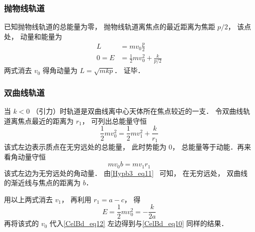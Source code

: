 \subsubsection{抛物线轨道}
已知抛物线轨道的总能量为零， 抛物线轨道离焦点的最近距离为焦距 $p/2$， 该点处， 动量和能量为
\begin{align}
L &= mv_0 \frac p2\\
0 = E &= \frac 12 mv_0^2 + \frac{k}{p/2}
\end{align}
两式消去 $v_0$ 得角动量为 $L = \sqrt{mkp}$． 证毕．

\subsubsection{双曲线轨道}
当 $k<0$ （引力）时轨道是双曲线离中心天体所在焦点较近的一支． 令双曲线轨道离焦点最近的距离为 $r_1$， 可列出总能量守恒
\begin{equation}\label{CelBd_eq11}
\frac12 mv_0^2 = \frac12 mv_1^2 + \frac{k}{r_1}
\end{equation}
该式左边表示质点在无穷远处的总能量， 此时势能为 $0$， 总能量等于动能．再来看角动量守恒
\begin{equation}\label{CelBd_eq12}
m v_0 b = m v_1 r_1
\end{equation}
该式左边为无穷远处的角动量． 由\autoref{Hypb3_eq11}~ 可知， 在无穷远处， 双曲线的渐近线与焦点的距离为 $b$．

用以上两式消去 $v_1$， 再利用 $r_1 = a - c$， 得
\begin{equation}\label{CelBd_eq13}
E = \frac 12 m v_0^2 = -\frac{k}{2a}
\end{equation}
再将该式的 $v_0$ 代入\autoref{CelBd_eq12} 左边得到与\autoref{CelBd_eq10} 同样的结果．